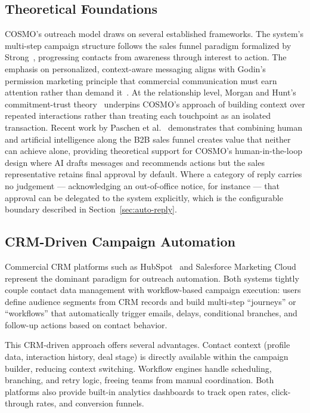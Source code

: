 \documentclass[a4paper]{article}
\begin{document}
\subsection{Theoretical Foundations}

COSMO's outreach model draws on several established frameworks. 
The system's multi-step campaign structure follows the sales funnel 
paradigm formalized by Strong~\cite{strong1925psychology}, progressing 
contacts from awareness through interest to action. The emphasis on 
personalized, context-aware messaging aligns with Godin's permission 
marketing principle that commercial communication must earn attention 
rather than demand it~\cite{godin1999permission}. At the relationship 
level, Morgan and Hunt's commitment-trust theory~\cite{morgan1994commitment} 
underpins COSMO's approach of building context over repeated 
interactions rather than treating each touchpoint as an isolated 
transaction. Recent work by Paschen et al.~\cite{paschen2020collaborative} 
demonstrates that combining human and artificial intelligence along 
the B2B sales funnel creates value that neither can achieve alone, 
providing theoretical support for COSMO's human-in-the-loop design 
where AI drafts messages and recommends actions but the sales 
representative retains final approval by default. Where a category of 
reply carries no judgement --- acknowledging an out-of-office notice, 
for instance --- that approval can be delegated to the system 
explicitly, which is the configurable boundary described in 
Section~\ref{sec:auto-reply}.

\subsection{CRM-Driven Campaign Automation}

Commercial CRM platforms such as HubSpot~\cite{hubspot_marketing_automation} 
and Salesforce Marketing Cloud~\cite{salesforce_journey_builder_pdf} 
represent the dominant paradigm for outreach automation. Both systems 
tightly couple contact data management with workflow-based campaign 
execution: users define audience segments from CRM records and build 
multi-step ``journeys'' or ``workflows'' that automatically trigger 
emails, delays, conditional branches, and follow-up actions based on 
contact behavior.

This CRM-driven approach offers several advantages. Contact context 
(profile data, interaction history, deal stage) is directly available 
within the campaign builder, reducing context switching. Workflow 
engines handle scheduling, branching, and retry logic, freeing teams 
from manual coordination. Both platforms also provide built-in 
analytics dashboards to track open rates, click-through rates, and 
conversion funnels.
\end{document}

